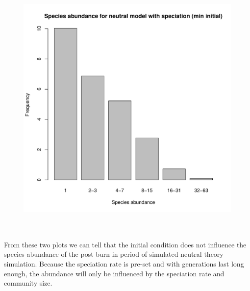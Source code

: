 \documentclass[12pt,a4paper]{article}
\begin{document}
\begin{figure}[t]
\centering
\includegraphics[width=\textwidth]{Q16Plot2.pdf}
\end{figure}
\\
\\
From these two plots we can tell that the initial condition does not influence the species abundance of the post burn-in period of simulated neutral theory simulation.
Because the speciation rate is pre-set and with generations last long enough, the abundance will only be influenced by the speciation rate and community size.


\newpage
\end{document}

